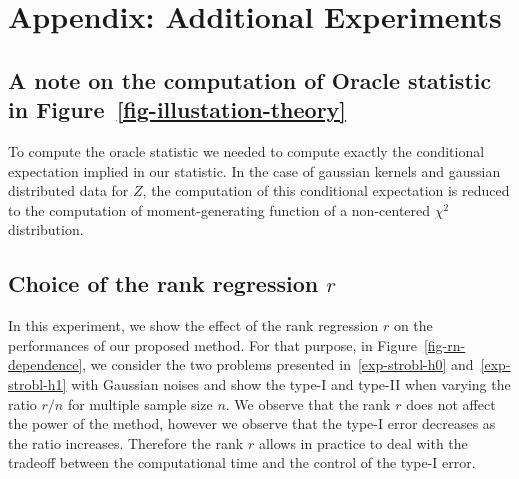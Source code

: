 \section{Appendix: Additional Experiments}
\subsection{A note on the computation of Oracle statistic in Figure~\ref{fig-illustation-theory}}
\label{sec-theoritical-findings}

To compute the oracle statistic we needed to compute exactly the conditional expectation implied in our statistic. In the case of gaussian kernels and gaussian distributed data for $Z$, the computation of this conditional expectation is reduced to the computation of moment-generating function of a non-centered $\chi^2$ distribution.

\newpage
\subsection{Choice of the rank regression $r$}
\label{sec-rank-rn}
In this experiment, we show the effect of the rank regression $r$ on the performances of our proposed method. For that purpose, in Figure~\ref{fig-rn-dependence}, we consider the two problems presented in~\eqref{exp-strobl-h0} and~\eqref{exp-strobl-h1}  with Gaussian noises and show the type-I and type-II when varying the ratio $r/n$ for multiple sample size $n$. We observe that the rank $r$ does not affect the power of the method, however we observe that the type-I error decreases as the ratio increases. Therefore the rank $r$ allows in practice to deal with the tradeoff between the computational time and the control of the type-I error.

